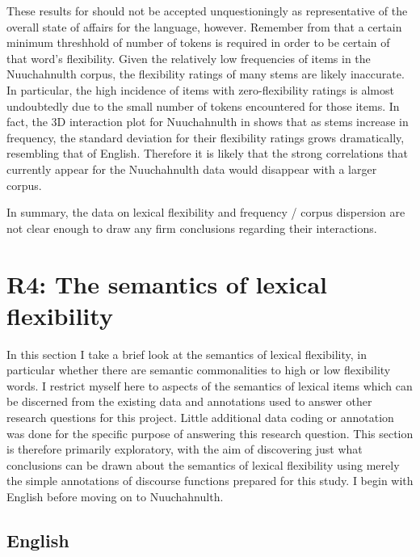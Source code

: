 These results for  should not be accepted unquestioningly as representative of the overall state of affairs for the language, however. Remember from  that a certain minimum threshhold of number of tokens is required in order to be certain of that word's flexibility. Given the relatively low frequencies of items in the Nuuchahnulth corpus, the flexibility ratings of many stems are likely inaccurate. In particular, the high incidence of items with zero-flexibility ratings is almost undoubtedly due to the small number of tokens encountered for those items. In fact, the 3D interaction plot for Nuuchahnulth in  shows that as stems increase in frequency, the standard deviation for their flexibility ratings grows dramatically, resembling that of English. Therefore it is likely that the strong correlations that currently appear for the Nuuchahnulth data would disappear with a larger corpus.

In summary, the data on lexical flexibility and frequency / corpus dispersion are not clear enough to draw any firm conclusions regarding their interactions.

\section{R4: The semantics of lexical flexibility}
\label{sec:4.6}

In this section I take a brief look at the semantics of lexical flexibility, in particular whether there are semantic commonalities to high or low flexibility words. I restrict myself here to aspects of the semantics of lexical items which can be discerned from the existing data and annotations used to answer other research questions for this project. Little additional data coding or annotation was done for the specific purpose of answering this research question. This section is therefore primarily exploratory, with the aim of discovering just what conclusions can be drawn about the semantics of lexical flexibility using merely the simple annotations of discourse functions prepared for this study. I begin with English before moving on to Nuuchahnulth.

\subsection{English}
\label{sec:4.6.1}

